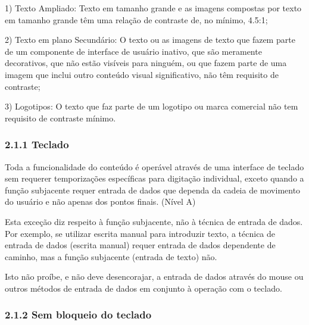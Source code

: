 \documentclass[a4paper]{article}
\begin{document}
\begin{titlepage}
\hspace{.1\textwidth} %
\begin{minipage}{.85\textwidth}
	1) Texto Ampliado: Texto em tamanho grande e as imagens compostas por texto em tamanho grande têm uma relação de contraste de, no mínimo, 4.5:1;\\
\end{minipage}

\hspace{.1\textwidth} %
\begin{minipage}{.85\textwidth}
	2) Texto em plano Secundário: O texto ou as imagens de texto que fazem parte de um componente de interface de usuário inativo, que são meramente decorativos, que não estão visíveis para ninguém, ou que fazem parte de uma imagem que inclui outro conteúdo visual significativo, não têm requisito de contraste;\\
\end{minipage}

\hspace{.1\textwidth} %
\begin{minipage}{.85\textwidth}
	3) Logotipos: O texto que faz parte de um logotipo ou marca comercial não tem requisito de contraste mínimo.\\
\end{minipage}

\subsubsection{2.1.1 Teclado}

Toda a funcionalidade do conteúdo é operável através de uma interface de teclado sem requerer temporizações específicas para digitação individual, exceto quando a função subjacente requer entrada de dados que dependa da cadeia de movimento do usuário e não apenas dos pontos finais. (Nível A)

Esta exceção diz respeito à função subjacente, não à técnica de entrada de dados. Por exemplo, se utilizar escrita manual para introduzir texto, a técnica de entrada de dados (escrita manual) requer entrada de dados dependente de caminho, mas a função subjacente (entrada de texto) não.

Isto não proíbe, e não deve desencorajar, a entrada de dados através do mouse ou outros métodos de entrada de dados em conjunto à operação com o teclado.

\subsubsection{2.1.2 Sem bloqueio do teclado}


\end{titlepage}
\end{document}
